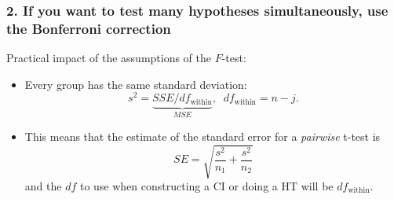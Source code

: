 \documentclass[slidestop,compress,mathserif,12pt,t,professionalfonts,xcolor=table]{beamer}
\newcommand{\bonferroni}{If you want to test many hypotheses simultaneously, use the Bonferroni correction}
\newcommand{\ftest}{You can use another version of the $F$-test to compare grouping by 2 variables vs. grouping by 1 variable}
\begin{document}

\begin{frame}
  \frametitle{2. \bonferroni}

Practical impact of the assumptions of the $F$-test:

\begin{itemize}

\item Every group has the same standard deviation:
\[
s^2 = \underbrace{SSE / df_{\text{within}}}_{MSE}, \; \; df_{\text{within}} = n - j.
\]

\item This means that the estimate of the standard error for a \emph{pairwise} t-test is
\[
SE = \sqrt{\frac{s^2}{n_1} + \frac{s^2}{n_2}}
\]
and the $df$ to use when constructing a CI or doing a HT will be $df_{\text{within}}$.

\end{itemize}

\end{frame}


\begin{frame}
  \frametitle{}

\vfill


\vfill

\end{frame}






\end{document}
